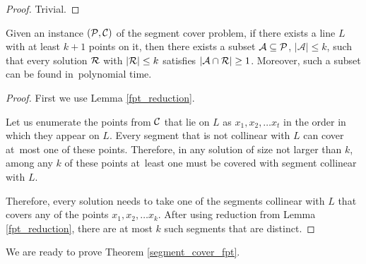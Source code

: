 \begin{proof} Trivial. \end{proof}

\begin{lemma}
	\label{fpt_long_lines}
	Given an instance $(\mathcal{P}, \mathcal{C})$ of the segment cover problem,
	if there exists a line $L$ with at least
	$k+1$ points on it, then there exists a subset $\mathcal{A} \subseteq \mathcal{P}$,
	$|\mathcal{A}| \le k$,
	such that every solution $\mathcal{R}$ with $|\mathcal{R}| \le k$
	satisfies $|\mathcal{A} \cap \mathcal{R}| \ge 1$.
	Moreover, such a subset can be found in~polynomial time.
\end{lemma}

\begin{proof}

First we use Lemma \ref{fpt_reduction}.

Let us enumerate the points from $\mathcal{C}$ that lie on $L$ as $x_1, x_2, \ldots x_t$
in the order in which they appear on $L$.
Every segment that is not collinear with $L$ can cover at~most one of these
points. Therefore, in any solution of size not larger than $k$,
among any $k$ of these points at~least one must
be covered with segment collinear with $L$.

Therefore, every solution needs to take one of the segments collinear
with $L$ that covers any of the points
$x_1, x_2, \ldots x_k$. After using reduction from Lemma \ref{fpt_reduction},
there are at most $k$ such segments that are distinct.
\end{proof}

We are ready to prove Theorem \ref{segment_cover_fpt}.

